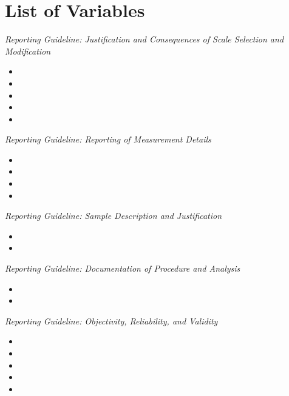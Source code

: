 \section{List of Variables}
{
\setlength{\parindent}{0pt}
\textit{Reporting Guideline: Justification and Consequences of Scale Selection and Modification}
\begin{itemize}
\item {}  %
\item {} 
\item {} 
\item {} 
\item {} 
\end{itemize}

\textit{Reporting Guideline: Reporting of Measurement Details}
\begin{itemize}
\item {} 
\item {} 
\item {} 
\item {} 
\end{itemize}

\textit{Reporting Guideline: Sample Description and Justification}
\begin{itemize}
\item {}  
\item {} 
\end{itemize}

\textit{Reporting Guideline: Documentation of Procedure and Analysis}
\begin{itemize}
\item {}  
\item {} 
\end{itemize}

\textit{Reporting Guideline: Objectivity, Reliability, and Validity}
\begin{itemize}
\item {}  %
\item {} 
\item {} 
\item {} 
\item {}  
\end{itemize}

}
